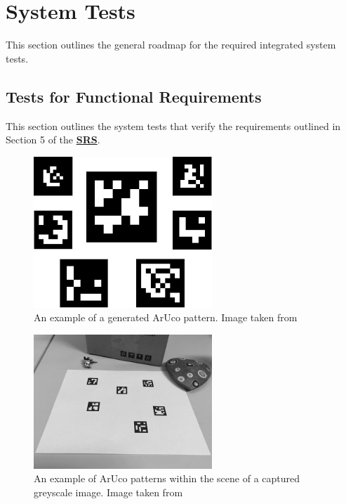 \documentclass[12pt, titlepage]{article}
\begin{document}
\section{System Tests}\label{Sys_Tests}
This section outlines the general roadmap for the required integrated system tests. 
\subsection{Tests for Functional Requirements} \label{FR_Tests}
This section outlines the system tests that verify the requirements outlined in 
Section 5 of the 
\textbf{\href{https://github.com/KiranSingh15/CAS-741-Image-Correspondences/blob/main/docs/SRS/SRS.pdf}
{SRS}}. 

\begin{figure}[h!]
  \begin{center}
   \includegraphics[width=0.6\textwidth]{images/ArUco_Field_Gen.jpg}
  \caption[An example of a generated ArUco pattern]{An example of a generated ArUco pattern. Image taken 
  from \cite{ARUCO_Markers_openCV}}
  \label{gen_aruco} 
  \end{center}
\end{figure}

\begin{figure}[h!]
  \begin{center}
   \includegraphics[width=0.6\textwidth]{images/GS_ArUco_Field_Image.jpg}
  \caption[An example of ArUco patterns within the scene of a captured greyscale image]
  {An example of ArUco patterns within the scene of a captured greyscale image. 
  Image taken from \cite{ARUCO_Markers_openCV}}
  \label{gs_aruco_field} 
  \end{center}
\end{figure}
\end{document}
